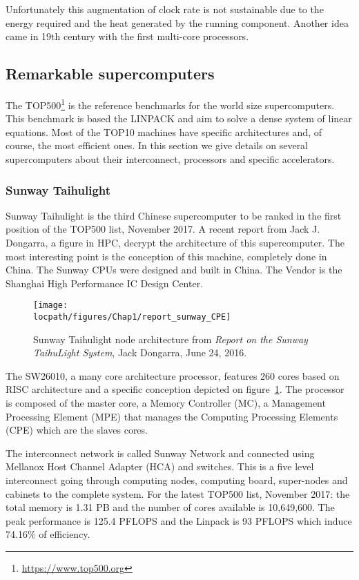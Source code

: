 Unfortunately this  augmentation of clock rate is not sustainable due to the energy required and the heat generated by the running component. 
Another idea came in 19th century with the first multi-core processors. 


\subsection{Remarkable supercomputers}
The TOP500\footnote{\url{https://www.top500.org}} is the reference benchmarks for the world size supercomputers. 
This benchmark is based the LINPACK and aim to solve a dense system of linear equations.
Most of the TOP10 machines have specific architectures and, of course, the most efficient ones. 
In this section we give details on several supercomputers about their interconnect, processors and specific accelerators. 

\subsubsection{Sunway Taihulight}
Sunway Taihulight is the third Chinese supercomputer to be ranked in the first position of the TOP500 list, November 2017. 
A recent report from Jack J. Dongarra, a figure in HPC, decrypt the architecture of this supercomputer\cite{dongarra2016report}. 
The most interesting point is the conception of this machine, completely done in China. 
The Sunway CPUs were designed and built in China. The Vendor is the Shanghai High Performance IC Design Center. 

\begin{figure}[t!]
\centering
\texttt{[image: \\locpath/figures/Chap1/report\_sunway\_CPE]}
\caption{Sunway Taihulight node architecture from \textit{Report on the Sunway TaihuLight System}, Jack Dongarra, June 24, 2016.}
\label{fig:chap1_report_sunway_CPE}
\end{figure}

The SW26010, a many core architecture processor, features 260 cores based on RISC architecture and a specific conception depicted on figure~\ref{fig:chap1_report_sunway_CPE}. 
The processor is composed of the master core, a Memory Controller (MC), a Management Processing Element (MPE) that manages the Computing Processing Elements (CPE) which are the slaves cores. 

The interconnect network is called Sunway Network and connected using Mellanox Host Channel Adapter (HCA) and switches. 
This is a five level interconnect going through computing nodes, computing board, super-nodes and cabinets to the complete system.
For the latest TOP500 list, November 2017: the total memory is 1.31 PB and the number of cores available is 10,649,600.
The peak performance is 125.4 PFLOPS and the Linpack is 93 PFLOPS which induce 74.16\% of efficiency. 


